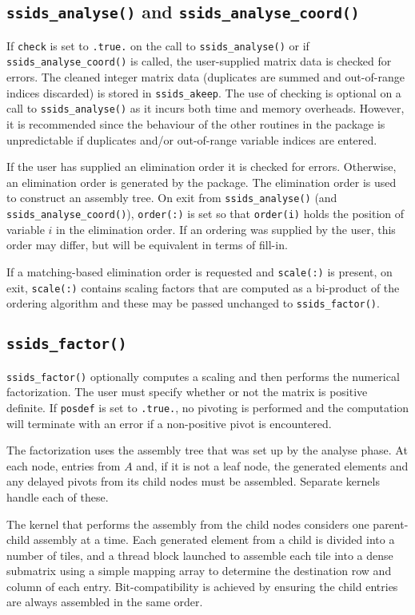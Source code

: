 \documentclass{spral}
\begin{document}
\subsection*{\texttt{ssids\_analyse()} and \texttt{ssids\_analyse\_coord()}}
If {\tt check} is set to {\tt .true.} on the call to {\tt ssids\_analyse()}
or if {\tt ssids\_analyse\_coord()} is called, 
the user-supplied matrix data is checked for errors. The cleaned integer matrix data
(duplicates are summed and out-of-range indices discarded) is stored in
{\tt ssids\_akeep}.
The use of checking is optional on a call to {\tt ssids\_analyse()} as it
incurs both time and memory overheads. However, it is recommended
since the behaviour of the other routines in the package
is unpredictable if duplicates and/or out-of-range variable indices are entered.

If the user has supplied an elimination order it is checked for errors. Otherwise,
an elimination order is generated by the package. 
The elimination order is used to construct an assembly tree.
On exit from {\tt ssids\_analyse()} (and {\tt ssids\_analyse\_coord()}), 
{\tt order(:)} is set so that {\tt order(i)} holds the position
of variable $i$ in the elimination order. If an ordering was supplied by the user, this
order may differ, but will be equivalent in terms of fill-in.

If a matching-based elimination order is requested and {\tt scale(:)} is present, on exit,
{\tt scale(:)} contains scaling factors that are computed as a bi-product of
the ordering algorithm and these may be passed unchanged to {\tt ssids\_factor()}.

\subsection*{\texttt{ssids\_factor()}}
{\tt ssids\_factor()} optionally computes a scaling and then performs the numerical factorization.
 The user must specify whether or not the matrix is
positive definite. If {\tt posdef} is set to {\tt .true.}, no pivoting
is performed and the computation will terminate with an error if a
non-positive pivot is encountered.

The factorization uses the assembly tree that was set up by the analyse phase.
At each  node,  entries from $A$ and, if it is not a leaf node,
the generated elements and any delayed pivots from its child nodes
must be assembled. Separate kernels handle each of these.


The kernel that performs the assembly from the child nodes considers one parent-child
assembly at a time. Each  generated element from a child is divided into a number of
tiles, and a thread block launched to assemble each tile into a 
dense submatrix using a simple
mapping array to determine the destination row and column of each entry.
Bit-compatibility is achieved by ensuring the child entries are
always assembled in the same order. 
\end{document}
